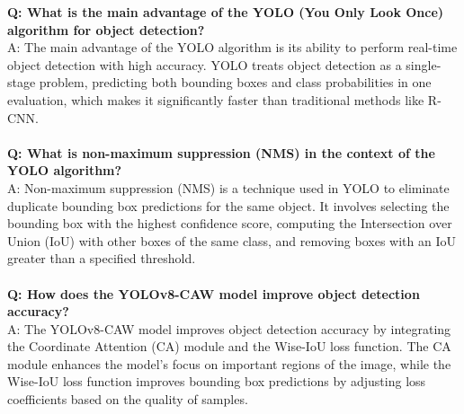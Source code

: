 %
%
%
\textbf{Q: What is the main advantage of the YOLO (You Only Look Once) algorithm for object detection?} \\
A: The main advantage of the YOLO algorithm is its ability to perform real-time object detection with high accuracy. YOLO treats object detection as a single-stage problem, predicting both bounding boxes and class probabilities in one evaluation, which makes it significantly faster than traditional methods like R-CNN.
\\\\
%
%
\textbf{Q: What is non-maximum suppression (NMS) in the context of the YOLO algorithm?} \\
A: Non-maximum suppression (NMS) is a technique used in YOLO to eliminate duplicate bounding box predictions for the same object. It involves selecting the bounding box with the highest confidence score, computing the Intersection over Union (IoU) with other boxes of the same class, and removing boxes with an IoU greater than a specified threshold.
\\\\
%
%
\textbf{Q: How does the YOLOv8-CAW model improve object detection accuracy?} \\
A: The YOLOv8-CAW model improves object detection accuracy by integrating the Coordinate Attention (CA) module and the Wise-IoU loss function. The CA module enhances the model's focus on important regions of the image, while the Wise-IoU loss function improves bounding box predictions by adjusting loss coefficients based on the quality of samples.
%
%
%